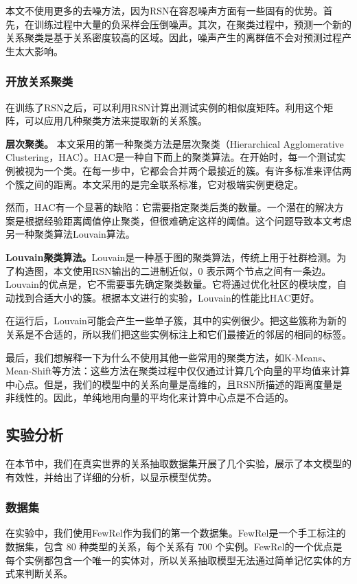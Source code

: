\begin{translation}
本文不使用更多的去噪方法，因为RSN在容忍噪声方面有一些固有的优势。首先，在训练过程中大量的负采样会压倒噪声。其次，在聚类过程中，预测一个新的关系聚类是基于关系密度较高的区域。因此，噪声产生的离群值不会对预测过程产生太大影响。

\subsubsection{开放关系聚类}
在训练了RSN之后，可以利用RSN计算出测试实例的相似度矩阵。利用这个矩阵，可以应用几种聚类方法来提取新的关系簇。

\textbf{层次聚类。} 本文采用的第一种聚类方法是层次聚类（Hierarchical Agglomerative Clustering，HAC）。HAC是一种自下而上的聚类算法。在开始时，每一个测试实例被视为一个类。在每一步中，它都会合并两个最接近的簇。有许多标准来评估两个簇之间的距离。本文采用的是完全联系标准，它对极端实例更稳定。

然而，HAC有一个显著的缺陷：它需要指定聚类后类的数量。一个潜在的解决方案是根据经验距离阈值停止聚类，但很难确定这样的阈值。这个问题导致本文考虑另一种聚类算法Louvain算法。

\textbf{Louvain聚类算法。}Louvain是一种基于图的聚类算法，传统上用于社群检测。为了构造图，本文使用RSN输出的二进制近似，$0$ 表示两个节点之间有一条边。Louvain的优点是，它不需要事先确定聚类数量。它将通过优化社区的模块度，自动找到合适大小的簇。根据本文进行的实验，Louvain的性能比HAC更好。

在运行后，Louvain可能会产生一些单子簇，其中的实例很少。把这些簇称为新的关系是不合适的，所以我们把这些实例标注上和它们最接近的邻居的相同的标签。

最后，我们想解释一下为什么不使用其他一些常用的聚类方法，如K-Means、Mean-Shift等方法：这些方法在聚类过程中仅仅通过计算几个向量的平均值来计算中心点。但是，我们的模型中的关系向量是高维的，且RSN所描述的距离度量是非线性的。因此，单纯地用向量的平均化来计算中心点是不合适的。


\subsection{实验分析}
在本节中，我们在真实世界的关系抽取数据集开展了几个实验，展示了本文模型的有效性，并给出了详细的分析，以显示模型优势。

\subsubsection{数据集}
在实验中，我们使用FewRel作为我们的第一个数据集。FewRel是一个手工标注的数据集，包含 $80$ 种类型的关系，每个关系有 $700$ 个实例。FewRel的一个优点是每个实例都包含一个唯一的实体对，所以关系抽取模型无法通过简单记忆实体的方式来判断关系。


\end{translation}
